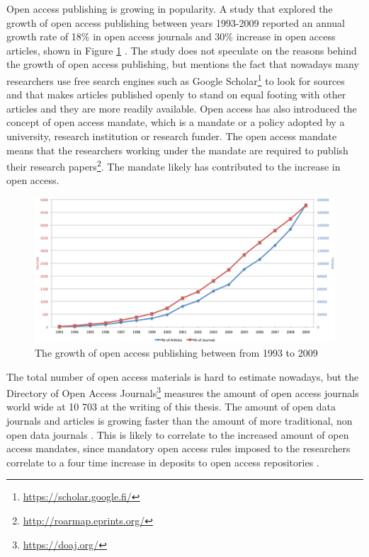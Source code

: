 Open access publishing is growing in popularity. A study that explored the
growth of open access publishing between years 1993-2009 reported an annual
growth rate of 18\% in open access journals and 30\% increase in open access
articles, shown in Figure \ref{fig:oa_increase} \cite{laakso2011development}.
The study does not speculate on the reasons behind the growth of open access
publishing, but mentions the fact that nowadays many researchers use free
search engines such as Google Scholar\footnote{\url{https://scholar.google.fi/}} to
look for sources and that makes articles published openly to stand on equal
footing with other articles and they are more readily available. Open access
has also introduced the concept of open access mandate, which is a mandate or
a policy adopted by a university, research institution or research funder.
The open access mandate means that the researchers working under the mandate
are required to publish their research papers\footnote{\url{http://roarmap.eprints.org/}}.
The mandate likely has contributed to the increase in open access.

\begin{figure}
    \begin{centering}
        \includegraphics[width=\textwidth]{images/oa_increase}
    \end{centering}
    \caption{The growth of open access publishing between from 1993 to 2009 \cite{laakso2011development}}
    \label{fig:oa_increase}
\end{figure}

The total number of open access materials is hard to estimate nowadays, but the
Directory of Open Access Journals\footnote{\url{https://doaj.org/}} measures the
amount of open access journals world wide at 10 703 at the writing of this
thesis. The amount of open data journals and articles is growing faster than the amount
of more traditional, non open data journals \cite{laakso2011development}. This
is likely to correlate to the increased amount of open access mandates, since
mandatory open access rules imposed to the researchers correlate to a four
time increase in deposits to open access repositories
\cite{DBLP:journals/corr/SwanGHH15}.

